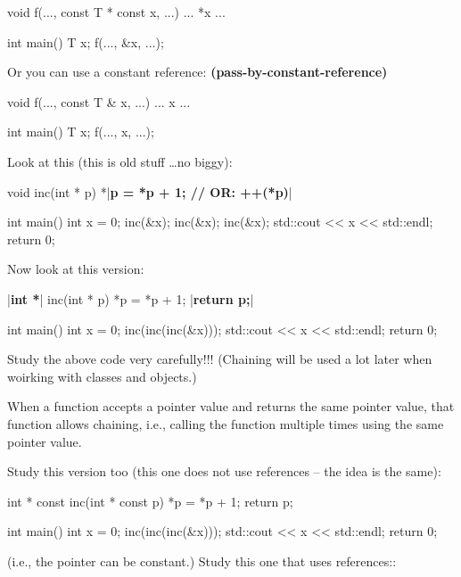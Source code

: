\begin{consolethree}[escapeinside=||]
void f(..., const T * const x, ...)
{
    ... *x ...
}

int main()
{
    T x;
    f(..., &x, ...);
}
\end{consolethree}
Or you can use a constant reference:
\textbf{(pass-by-constant-reference)}

\begin{consolethree}[escapeinside=||]
void f(..., const T & x, ...)
{
    ... x ...
}

int main()
{
    T x;
    f(..., x, ...);
}
\end{consolethree}

\newpage{}

Look at this (this is old stuff \ldots no biggy):

\begin{consolethree}[escapeinside=||]
void inc(int * p)
{
    *|\textbf{p = *p + 1; // OR: ++(*p)}|
}

int main()
{
    int x = 0;
    inc(&x); inc(&x); inc(&x);
    std::cout << x << std::endl;
    return 0;
}
\end{consolethree}
Now look at this version:

\begin{consolethree}[escapeinside=||]

|\textbf{int *}| inc(int * p)
{
    *p = *p + 1;
    |\textbf{return p;}|
}

int main()
{
    int x = 0;
    inc(inc(inc(&x)));
    std::cout << x << std::endl;
    return 0;
}
\end{consolethree}
Study the above code very carefully!!! (Chaining will be used a lot later when woirking with classes and objects.)

When a function accepts a pointer value and returns the same pointer value, that function allows chaining, i.e., calling the function multiple times using the same pointer value.

Study this version too (this one does not use references -- the idea is the same):

\begin{consolethree}[escapeinside=||]

int * const inc(int * const p)
{
    *p = *p + 1;
    return p;
}

int main()
{
    int x = 0;
    inc(inc(inc(&x)));
    std::cout << x << std::endl;
    return 0;
}
\end{consolethree}
(i.e., the pointer can be constant.) Study this one that uses references::

